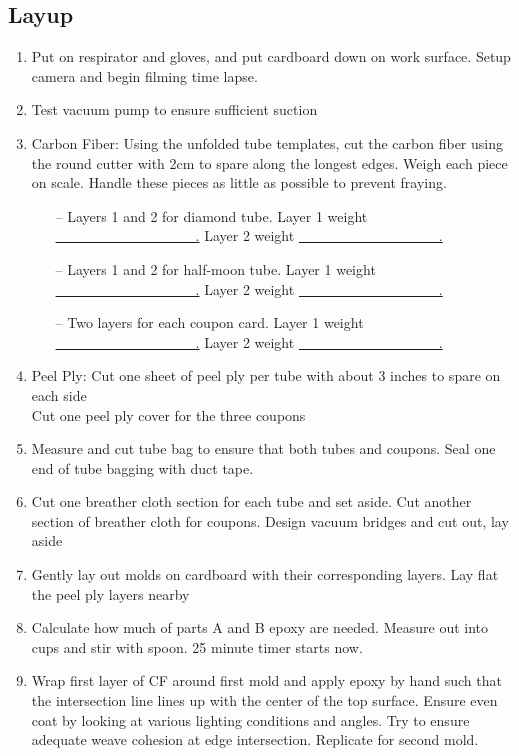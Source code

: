 \documentclass{article}
\begin{document}
\subsection{Layup}
\begin{enumerate}
    \item Put on respirator and gloves, and put cardboard down on work surface. Setup camera and begin filming time lapse. 
    \item Test vacuum pump to ensure sufficient suction
    \item Carbon Fiber: Using the unfolded tube templates, cut the carbon fiber using the round cutter with 2cm to spare along the longest edges. Weigh each piece on scale. Handle these pieces as little as possible to prevent fraying.
        \begin{itemize}
            \item[--] Layers 1 and 2 for diamond tube. Layer 1 weight \underline{~~~~~~~~~~~~~~~~~~~~.} Layer 2 weight \underline{~~~~~~~~~~~~~~~~~~~~.}
            \item[--] Layers 1 and 2 for half-moon tube. Layer 1 weight \underline{~~~~~~~~~~~~~~~~~~~~.} Layer 2 weight \underline{~~~~~~~~~~~~~~~~~~~~.}
            \item[--] Two layers for each coupon card. Layer 1 weight \underline{~~~~~~~~~~~~~~~~~~~~.} Layer 2 weight \underline{~~~~~~~~~~~~~~~~~~~~.}
        \end{itemize}
    \item Peel Ply: Cut one sheet of peel ply per tube with about 3 inches to spare on each side \\
    Cut one peel ply cover for the three coupons
    \item Measure and cut tube bag to ensure that both tubes and coupons. Seal one end of tube bagging with duct tape. 
    \item Cut one breather cloth section for each tube and set aside. Cut another section of breather cloth for coupons. Design vacuum bridges and cut out, lay aside
    \item Gently lay out molds on cardboard with their corresponding layers. Lay flat the peel ply layers nearby 
    \item Calculate how much of parts A and B epoxy are needed. Measure out into cups and stir with spoon. 25 minute timer starts now. 
    \item Wrap first layer of CF around first mold and apply epoxy by hand such that the intersection line lines up with the center of the top surface. Ensure even coat by looking at various lighting conditions and angles. Try to ensure adequate weave cohesion at edge intersection. Replicate for second mold. 

\end{enumerate}
\end{document}
